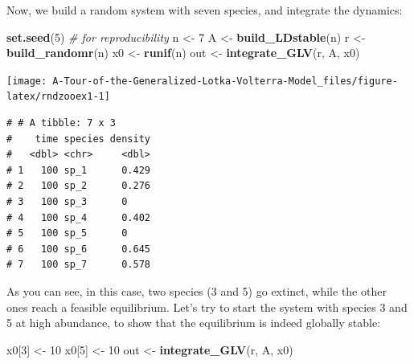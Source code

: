 \documentclass[
]{book}
\newenvironment{Shaded}{\begin{snugshade}}{\end{snugshade}}
\newcommand{\CommentTok}[1]{\textcolor[rgb]{0.56,0.35,0.01}{\textit{#1}}}
\newcommand{\DataTypeTok}[1]{\textcolor[rgb]{0.13,0.29,0.53}{#1}}
\newcommand{\DecValTok}[1]{\textcolor[rgb]{0.00,0.00,0.81}{#1}}
\newcommand{\KeywordTok}[1]{\textcolor[rgb]{0.13,0.29,0.53}{\textbf{#1}}}
\newcommand{\NormalTok}[1]{#1}
\newcommand{\OperatorTok}[1]{\textcolor[rgb]{0.81,0.36,0.00}{\textbf{#1}}}
\newcommand{\StringTok}[1]{\textcolor[rgb]{0.31,0.60,0.02}{#1}}
\begin{document}
Now, we build a random system with seven species, and integrate the dynamics:

\begin{Shaded}
\begin{Highlighting}[]
\KeywordTok{set.seed}\NormalTok{(}\DecValTok{5}\NormalTok{) }\CommentTok{# for reproducibility}
\NormalTok{n <-}\StringTok{ }\DecValTok{7}
\NormalTok{A <-}\StringTok{ }\KeywordTok{build_LDstable}\NormalTok{(n)}
\NormalTok{r <-}\StringTok{ }\KeywordTok{build_randomr}\NormalTok{(n)}
\NormalTok{x0 <-}\StringTok{ }\KeywordTok{runif}\NormalTok{(n)}
\NormalTok{out <-}\StringTok{ }\KeywordTok{integrate_GLV}\NormalTok{(r, A, x0)}
\end{Highlighting}
\end{Shaded}

\begin{center}\texttt{[image: A-Tour-of-the-Generalized-Lotka-Volterra-Model\_files/figure-latex/rndzooex1-1]} \end{center}

\begin{Shaded}
\end{Shaded}

\begin{verbatim}
# # A tibble: 7 x 3
#    time species density
#   <dbl> <chr>     <dbl>
# 1   100 sp_1      0.429
# 2   100 sp_2      0.276
# 3   100 sp_3      0    
# 4   100 sp_4      0.402
# 5   100 sp_5      0    
# 6   100 sp_6      0.645
# 7   100 sp_7      0.578
\end{verbatim}

As you can see, in this case, two species (3 and 5) go extinct, while the other ones reach a feasible equilibrium. Let's try to start the system with species 3 and 5 at high abundance, to show that the equilibrium is indeed globally stable:

\begin{Shaded}
\begin{Highlighting}[]
\NormalTok{x0[}\DecValTok{3}\NormalTok{] <-}\StringTok{ }\DecValTok{10}
\NormalTok{x0[}\DecValTok{5}\NormalTok{] <-}\StringTok{ }\DecValTok{10}
\NormalTok{out <-}\StringTok{ }\KeywordTok{integrate_GLV}\NormalTok{(r, A, x0)}
\end{Highlighting}
\end{Shaded}
\end{document}
